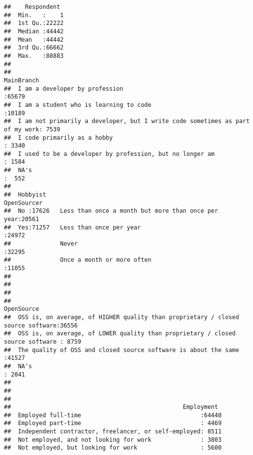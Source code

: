 \documentclass[]{article}
\begin{document}
\begin{verbatim}
##    Respondent   
##  Min.   :    1  
##  1st Qu.:22222  
##  Median :44442  
##  Mean   :44442  
##  3rd Qu.:66662  
##  Max.   :88883  
##                 
##                                                                          MainBranch   
##  I am a developer by profession                                               :65679  
##  I am a student who is learning to code                                       :10189  
##  I am not primarily a developer, but I write code sometimes as part of my work: 7539  
##  I code primarily as a hobby                                                  : 3340  
##  I used to be a developer by profession, but no longer am                     : 1584  
##  NA's                                                                         :  552  
##                                                                                       
##  Hobbyist                                                OpenSourcer   
##  No :17626   Less than once a month but more than once per year:20561  
##  Yes:71257   Less than once per year                           :24972  
##              Never                                             :32295  
##              Once a month or more often                        :11055  
##                                                                        
##                                                                        
##                                                                        
##                                                                            OpenSource   
##  OSS is, on average, of HIGHER quality than proprietary / closed source software:36556  
##  OSS is, on average, of LOWER quality than proprietary / closed source software : 8759  
##  The quality of OSS and closed source software is about the same                :41527  
##  NA's                                                                           : 2041  
##                                                                                         
##                                                                                         
##                                                                                         
##                                                 Employment   
##  Employed full-time                                  :64440  
##  Employed part-time                                  : 4469  
##  Independent contractor, freelancer, or self-employed: 8511  
##  Not employed, and not looking for work              : 3803  
##  Not employed, but looking for work                  : 5600  

\end{verbatim}
\end{document}
